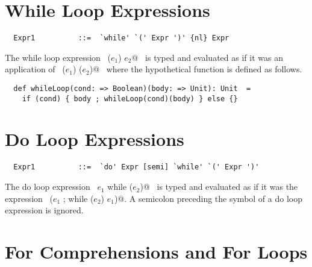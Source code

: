 \section{While Loop Expressions}\label{sec:while}

\syntax\begin{lstlisting}
  Expr1          ::=  `while' `(' Expr ')' {nl} Expr
\end{lstlisting}

The while loop expression ~\lstinline@while ($e_1$) $e_2$@~ is typed and
evaluated as if it was an application of ~\lstinline@whileLoop ($e_1$) ($e_2$)@~ where
the hypothetical function  is defined as follows.

\begin{lstlisting}
  def whileLoop(cond: => Boolean)(body: => Unit): Unit  =
    if (cond) { body ; whileLoop(cond)(body) } else {}
\end{lstlisting}


\section{Do Loop Expressions}

\syntax\begin{lstlisting}
  Expr1          ::=  `do' Expr [semi] `while' `(' Expr ')'
\end{lstlisting}

The do loop expression ~\lstinline@do $e_1$ while ($e_2$)@~ is typed and
evaluated as if it was the expression ~\lstinline@($e_1$ ; while ($e_2$) $e_1$)@.
A semicolon preceding the  symbol of a do loop expression is ignored.

\section{For Comprehensions and For Loops}\label{sec:for-comprehensions}


